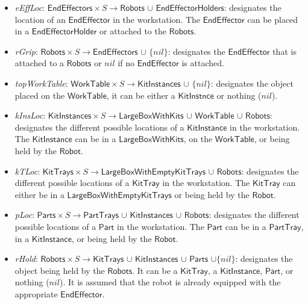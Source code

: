 \documentclass[a4paper, 10pt, conference]{ieeeconf}      %
\begin{document}
\begin{itemize}
\item \emph{eEffLoc}: $\mathsf{EndEffectors}\times S\rightarrow\mathsf{Robots}$ $\cup$ $\mathsf{EndEffectorHolders}$: designates the location of an $\mathsf{EndEffector}$ in the workstation. The $\mathsf{EndEffector}$ can be placed in a $\mathsf{EndEffectorHolder}$ or attached to the $\mathsf{Robots}$.

\item \emph{rGrip}: $\mathsf{Robots}\times S\rightarrow\mathsf{EndEffectors}$ $\cup$ $\lbrace nil\rbrace$: designates the $\mathsf{EndEffector}$ that is attached to a $\mathsf{Robots}$ or $nil$ if no $\mathsf{EndEffector}$ is attached.

\item \emph{topWorkTable}: $\mathsf{WorkTable}\times S\rightarrow\mathsf{KitInstances}$ $\cup$ $\lbrace nil\rbrace$: designates the object placed on the $\mathsf{WorkTable}$, it can be either a $\mathsf{KitInstnce}$ or nothing ($nil$).

\item \emph{kInsLoc}: $\mathsf{KitInstances}\times S\rightarrow\mathsf{LargeBoxWithKits}$ $\cup$ $\mathsf{WorkTable}$ $\cup$ $\mathsf{Robots}$: designates the different possible locations of a $\mathsf{KitInstance}$ in the workstation. The $\mathsf{KitInstance}$ can be in a $\mathsf{LargeBoxWithKits}$, on the $\mathsf{WorkTable}$, or being held by the $\mathsf{Robot}$.

\item \emph{kTLoc}: $\mathsf{KitTrays}\times S\rightarrow\mathsf{LargeBoxWithEmptyKitTrays}$ $\cup$ $\mathsf{Robots}$: designates the different possible locations of a $\mathsf{KitTray}$ in the workstation. The $\mathsf{KitTray}$ can either be in a $\mathsf{LargeBoxWithEmptyKitTrays}$ or being held by the $\mathsf{Robot}$.

\item \emph{pLoc}: $\mathsf{Parts}\times S\rightarrow\mathsf{PartTrays}$ $\cup$ $\mathsf{KitInstances}$ $\cup$ $\mathsf{Robots}$: designates the different possible locations of a $\mathsf{Part}$ in the workstation. The $\mathsf{Part}$ can be in a $\mathsf{PartTray}$, in a $\mathsf{KitInstance}$, or being held by the $\mathsf{Robot}$.

\item \emph{rHold}: $\mathsf{Robots}\times S\rightarrow\mathsf{KitTrays}$ $\cup$ $\mathsf{KitInstances}$ $\cup$ $\mathsf{Parts}$ $\cup \lbrace nil\rbrace$: designates the object being held by the $\mathsf{Robots}$. It can be a $\mathsf{KitTray}$, a $\mathsf{KitInstance}$, $\mathsf{Part}$, or nothing ($nil$). It is assumed that the robot is already equipped with the appropriate $\mathsf{EndEffector}$.


\end{itemize}
\end{document}
